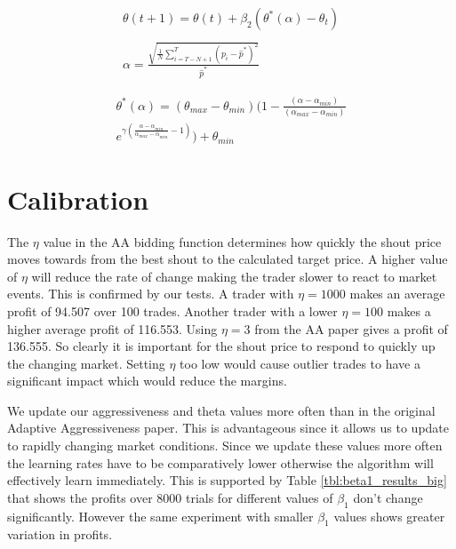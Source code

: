 \documentclass[preprint]{acm_proc_article-sp} %
\begin{document}

\begin{equation}
\label{eqn:update_theta}
\begin{split}
    \theta(t+1)=\theta(t)+\beta_2(\theta^*(\alpha)-\theta_t)\\\\
    \alpha = \frac{\sqrt{\frac 1 N \sum^T_{i=T-N+1}(p_i-\hat p^*)^2}}{\hat p^*}
\end{split}
\end{equation}

\begin{equation}
  \begin{split}
    \label{eqn:theta_star}
    \theta^*(\alpha) = (\theta_{max}-\theta_{min})
    (1-\frac{(\alpha-\alpha_{min})}{(\alpha_{max} -\alpha_{min})} \\
    e^{\gamma(\frac{\alpha-\alpha_{min}}{\alpha_{max}-\alpha_{min}}-1)})
    + \theta_{min}
  \end{split}
\end{equation}

\section{Calibration} \label{sec:calibration}
The $\eta$ value in the AA bidding function determines how quickly the shout
price moves towards from the best shout to the calculated target price. A
higher value of $\eta$ will reduce the rate of change making the trader slower
to react to market events. This is confirmed by our tests. A trader with $\eta
= 1000$ makes an average profit of 94.507 over 100 trades. Another trader with
a lower $\eta = 100$ makes a higher average profit of 116.553. Using $\eta = 3$
from the AA paper gives a profit of 136.555. So clearly it is important for the
shout price to respond to quickly up the changing market. Setting $\eta$ too
low would cause outlier trades to have a significant impact which would reduce
the margins.

We update our aggressiveness and theta values more often than in the original Adaptive Aggressiveness 
paper\cite{AA_thesis}. This is advantageous since it allows us to update to rapidly changing market 
conditions. Since we update these values more often the learning rates have to be comparatively lower 
otherwise the algorithm will effectively learn immediately. This is supported by Table \ref{tbl:beta1_results_big} that shows 
the profits over 8000 trials for different values of $\beta_1$ don't change significantly. However 
the same experiment with smaller $\beta_1$ values shows greater variation in profits.
\end{document}
